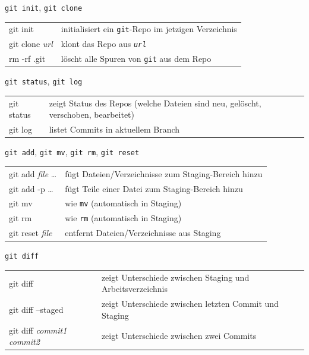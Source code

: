 \begin{frame}{\texttt{git init}, \texttt{git clone}}
  \begin{tabu}{>{\ttfamily}l X}
    git init               & initialisiert ein \texttt{git}-Repo im jetzigen Verzeichnis \\
    git clone \textit{url} & klont das Repo aus \texttt{\textit{url}} \\
    rm -rf .git            & löscht alle Spuren von \texttt{git} aus dem Repo
  \end{tabu}
\end{frame}

\begin{frame}{\texttt{git status}, \texttt{git log}}
  \begin{tabu}{>{\ttfamily}l X}
    git status & zeigt Status des Repos (welche Dateien sind neu, gelöscht, verschoben, bearbeitet) \\
    git log    & listet Commits in aktuellem Branch
  \end{tabu}
\end{frame}

\begin{frame}{\texttt{git add}, \texttt{git mv}, \texttt{git rm}, \texttt{git reset}}
  \begin{tabu}{>{\ttfamily}l X}
    git add \textit{file} … & fügt Dateien/Verzeichnisse zum Staging-Bereich hinzu \\
    git add -p …            & fügt Teile einer Datei zum Staging-Bereich hinzu \\
    git mv                  & wie \texttt{mv} (automatisch in Staging)\\
    git rm                  & wie \texttt{rm} (automatisch in Staging) \\
    git reset \textit{file} & entfernt Dateien/Verzeichnisse aus Staging
  \end{tabu}
\end{frame}

\begin{frame}{\texttt{git diff}}
  \begin{tabu}{>{\ttfamily}l X}
    git diff                                   & zeigt Unterschiede zwischen Staging und Arbeitsverzeichnis \\
    git diff --staged                          & zeigt Unterschiede zwischen letzten Commit und Staging \\
    git diff \textit{commit1} \textit{commit2} & zeigt Unterschiede zwischen zwei Commits
  \end{tabu}
\end{frame}

